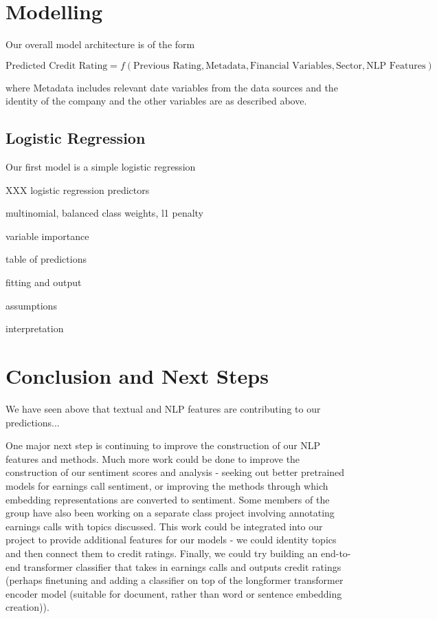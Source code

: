 \documentclass{article}[11pt]
\begin{document}
    \section*{Modelling}

    Our overall model architecture is of the form

    \begin{equation*}
        \text{Predicted Credit Rating} = f(\text{Previous Rating}, \text{Metadata}, \text{Financial Variables}, \text{Sector}, \text{NLP Features})
    \end{equation*}

    where Metadata includes relevant date variables from the data sources and the identity of the company and the other variables are as described above.

    \subsection*{Logistic Regression}

    Our first model is a simple logistic regression

    XXX logistic regression predictors

    multinomial, balanced class weights, l1 penalty

    variable importance

    table of predictions

    fitting and output

    assumptions
    
    interpretation

    \section*{Conclusion and Next Steps}

    We have seen above that textual and NLP features are contributing to our predictions...

    One major next step is continuing to improve the construction of our NLP features and methods. Much more work could be done to improve the construction of our sentiment scores and analysis - seeking out better pretrained models for earnings call sentiment, or improving the methods through which embedding representations are converted to sentiment. Some members of the group have also been working on a separate class project involving annotating earnings calls with topics discussed. This work could be integrated into our project to provide additional features for our models - we could identity topics and then connect them to credit ratings. Finally, we could try building an end-to-end transformer classifier that takes in earnings calls and outputs credit ratings (perhaps finetuning and adding a classifier on top of the longformer \citep{beltagy_longformer_2020} transformer encoder model (suitable for document, rather than word or sentence embedding creation)).
\end{document}
